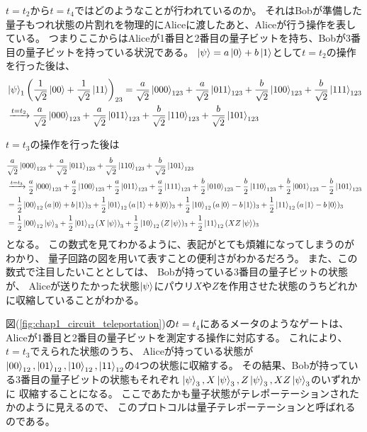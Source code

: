 \documentclass[../master.tex]{subfiles}
\begin{document}
\(t=t_2\)から\(t=t_4\)ではどのようなことが行われているのか。
それはBobが準備した量子もつれ状態の片割れを物理的にAliceに渡したあと、Aliceが行う操作を表している。
つまりここからはAliceが1番目と2番目の量子ビットを持ち、Bobが3番目の量子ビットを持っている状況である。
\(\ket{\psi}=a\ket{0}+b\ket{1}\)として\(t=t_2\)の操作を行った後は、
\begin{equation}\begin{aligned}[b]
    &\ket{\psi}_1\qty(\frac{1}{\sqrt{2}}\ket{00}+\frac{1}{\sqrt{2}}\ket{11})_{23}
    =\frac{a}{\sqrt{2}}\ket{000}_{123}+\frac{a}{\sqrt{2}}\ket{011}_{123}+\frac{b}{\sqrt{2}}\ket{100}_{123}+\frac{b}{\sqrt{2}}\ket{111}_{123}\\
    &\xrightarrow{t=t_2}\frac{a}{\sqrt{2}}\ket{000}_{123}+\frac{a}{\sqrt{2}}\ket{011}_{123}+\frac{b}{\sqrt{2}}\ket{110}_{123}+\frac{b}{\sqrt{2}}\ket{101}_{123}\\
\end{aligned}\end{equation}
\(t=t_3\)の操作を行った後は
\begin{equation}\begin{aligned}[b]
    &\frac{a}{\sqrt{2}}\ket{000}_{123}+\frac{a}{\sqrt{2}}\ket{011}_{123}+\frac{b}{\sqrt{2}}\ket{110}_{123}+\frac{b}{\sqrt{2}}\ket{101}_{123}\\
    &\xrightarrow{t=t_3}\frac{a}{2}\ket{000}_{123}+\frac{a}{2}\ket{100}_{123}+\frac{a}{2}\ket{011}_{123}+\frac{a}{2}\ket{111}_{123}
    +\frac{b}{2}\ket{010}_{123}-\frac{b}{2}\ket{110}_{123}+\frac{b}{2}\ket{001}_{123}-\frac{b}{2}\ket{101}_{123}\\
    &=\frac{1}{2}\ket{00}_{12}(a\ket{0}+b\ket{1})_3+\frac{1}{2}\ket{01}_{12}(a\ket{1}+b\ket{0})_3
    +\frac{1}{2}\ket{10}_{12}(a\ket{0}-b\ket{1})_3+\frac{1}{2}\ket{11}_{12}(a\ket{1}-b\ket{0})_3\\
    &=\frac{1}{2}\ket{00}_{12}\ket{\psi}_3+\frac{1}{2}\ket{01}_{12}\qty(X\ket{\psi})_3
    +\frac{1}{2}\ket{10}_{12}(Z\ket{\psi})_3+\frac{1}{2}\ket{11}_{12}(XZ\ket{\psi})_3
\end{aligned}\end{equation}
となる。
この数式を見てわかるように、表記がとても煩雑になってしまうのがわかり、
量子回路の図を用いて表すことの便利さがわかるだろう。
また、この数式で注目したいこととしては、
Bobが持っている3番目の量子ビットの状態が、
Aliceが送りたかった状態\(\ket{\psi}\)にパウリ\(X\)や\(Z\)を作用させた状態のうちどれかに収縮していることがわかる。

図(\ref{fig:chap1_circuit_teleportation})の\(t=t_4\)にあるメータのようなゲートは、
Aliceが1番目と2番目の量子ビットを測定する操作に対応する。
これにより、\(t=t_3\)でえられた状態のうち、
Aliceが持っている状態が
\(\ket{00}_{12},\ket{01}_{12},\ket{10}_{12},\ket{11}_{12}\)の4つの状態に収縮する。
その結果、Bobが持っている3番目の量子ビットの状態もそれぞれ
\(\ket{\psi}_3, X\ket{\psi}_3, Z\ket{\psi}_3, XZ\ket{\psi}_3\)のいずれかに
収縮することになる。
ここであたかも量子状態がテレポーテーションされたかのように見えるので、
このプロトコルは量子テレポーテーションと呼ばれるのである。
\end{document}
